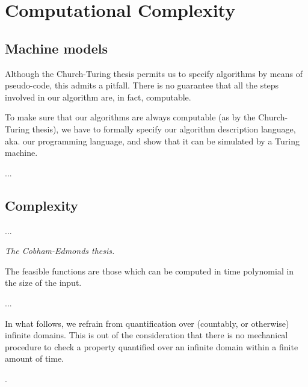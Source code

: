 \chapter{Computational Complexity}




\section{Machine models}

Although the Church-Turing thesis permits us to specify algorithms by means of
pseudo-code, this admits a pitfall. There is no guarantee that all the steps
involved in our algorithm are, in fact, computable.

To make sure that our algorithms are always computable (as by the Church-Turing
thesis), we have to formally specify our algorithm description language, aka.
our programming language, and show that it can be simulated by a Turing
machine.

...





\section{Complexity}

...

\begin{notion} \emph{The Cobham-Edmonds thesis.}

The feasible functions are those which can be computed in time polynomial in
the size of the input.

\end{notion}

...


In what follows, we refrain from quantification over (countably, or otherwise)
infinite domains. This is out of the consideration that there is no mechanical
procedure to check a property quantified over an infinite domain within a
finite amount of time.

.
